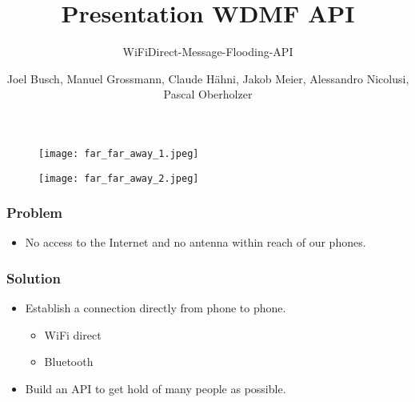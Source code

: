 \documentclass[11pt]{beamer}
\author{Joel Busch, Manuel Grossmann, Claude Hähni, Jakob Meier, Alessandro Nicolusi, Pascal Oberholzer}
\title{Presentation WDMF API}
\subtitle{WiFiDirect-Message-Flooding-API}
\institute{}
\date{}
\begin{document}
	\maketitle
	
	\begin{frame}
		\begin{figure}
			\texttt{[image: far\_far\_away\_1.jpeg]}
		\end{figure}
	\end{frame}
	
	\begin{frame}
		\begin{figure}
			\texttt{[image: far\_far\_away\_2.jpeg]}
		\end{figure}
	\end{frame}
	
	\begin{frame}
		\frametitle{Problem}
		\begin{itemize}
			\item No access to the Internet and no antenna within reach of our phones.
		\end{itemize}
	\end{frame}
	
	\begin{frame}
		\frametitle{Solution}
		\begin{itemize}
			\item Establish a connection directly from phone to phone.
			\begin{itemize}
				\item WiFi direct
				\item Bluetooth
			\end{itemize}
			\item Build an API to get hold of many people as possible.
		\end{itemize}
	\end{frame}
	
\end{document}
